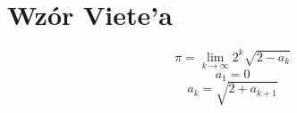 \section{Wzór Viete'a}


$$\pi=\lim\limits_{k\to\infty}2^k\sqrt{2-a_k}$$
$$a_1=0$$
$$a_k=\sqrt{2+a_{k+1}}$$
